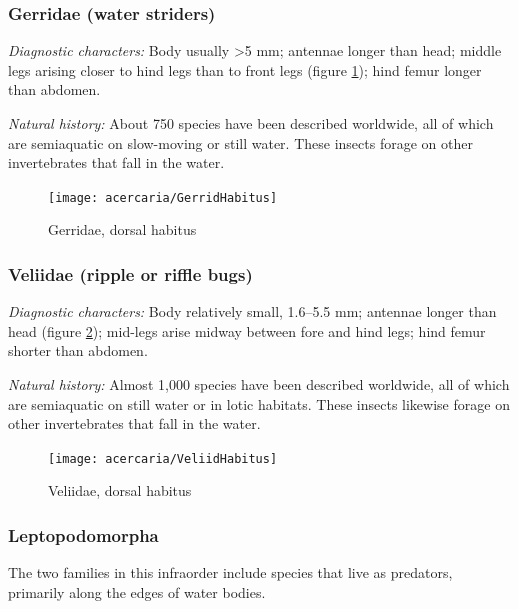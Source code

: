 \subsubsection{Gerridae (water striders)}
\noindent{}\textit{Diagnostic characters:} Body usually \textgreater5 mm; antennae longer than head; middle legs arising closer to hind legs than to front legs (figure \ref{fig:gerrid1}); hind femur longer than abdomen.\vspace{3mm}

\noindent{}\textit{Natural history:} About 750 species have been described worldwide, all of which are semiaquatic on slow-moving or still water. These insects forage on other invertebrates that fall in the water.\vspace{3mm}

\begin{figure}[ht!]
 \centering
 \texttt{[image: acercaria/GerridHabitus]}
 \caption{Gerridae, dorsal habitus \citep[][Plate 7, Fig. 12]{bhl37902}}
 \label{fig:gerrid1}
\end{figure}

\subsubsection{Veliidae (ripple or riffle bugs)}
\noindent{}\textit{Diagnostic characters:} Body relatively small, 1.6--5.5 mm; antennae longer than head (figure \ref{fig:veliid1}); mid-legs arise midway between fore and hind legs; hind femur shorter than abdomen.\vspace{3mm}

\noindent{}\textit{Natural history:} Almost 1,000 species have been described worldwide, all of which are semiaquatic on still water or in lotic habitats. These insects likewise forage on other invertebrates that fall in the water.\vspace{3mm}

\begin{figure}[ht!]
 \centering
 \texttt{[image: acercaria/VeliidHabitus]}
 \caption{Veliidae, dorsal habitus \citep[][Plate 7, Fig. 11]{bhl37902}}
 \label{fig:veliid1}
\end{figure}

\subsubsection{Leptopodomorpha}
The two families in this infraorder include species that live as predators, primarily along the edges of water bodies.


